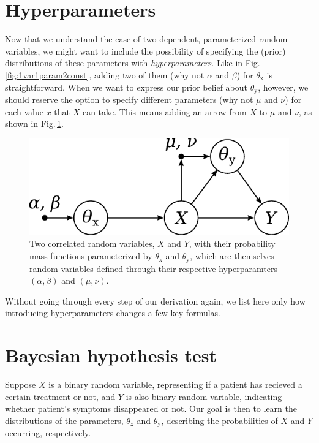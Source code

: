 \documentclass[]{report}
\begin{document}
\section{Hyperparameters}
Now that we understand the case of two dependent, parameterized random variables, we might want to include the possibility of specifying the (prior) distributions of these parameters with \emph{hyperparameters}. Like in Fig.\,\ref{fig:1var1param2const}, adding two of them (why not $\alpha$ and $\beta$) for $\theta_\mathrm{x}$ is straightforward. When we want to express our prior belief about $\theta_\mathrm{y}$, however, we should reserve the option to specify different parameters (why not $\mu$ and $\nu$) for each value $x$ that $X$ can take. This means adding an arrow from $X$ to $\mu$ and $\nu$, as shown in Fig.\,\ref{fig:2var2param4const}.
\begin{figure}[h]
	\centering
	\includegraphics[scale=0.5]{2var_2param_4const}
	\caption{Two correlated random variables, $X$ and $Y$, with their probability mass functions parameterized by $\theta_\mathrm{x}$ and $\theta_\mathrm{y}$, which are themselves random variables defined through their respective hyperparamters $(\alpha, \beta)$ and $(\mu, \nu)$.}
	\label{fig:2var2param4const}
\end{figure}

Without going through every step of our derivation again, we list here only how introducing hyperparameters changes a few key formulas.

\section{Bayesian hypothesis test}
Suppose $X$ is a binary random variable, representing if a patient has recieved a certain treatment or not, and $Y$ is also binary random variable, indicating whether patient's symptoms disappeared or not. Our goal is then to learn the distributions of the parameters, $\theta_\mathrm{x}$ and $\theta_\mathrm{y}$, describing the probabilities of $X$ and $Y$ occurring, respectively.
\end{document}
